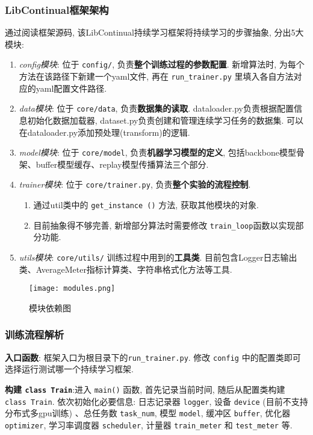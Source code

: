 \subsubsection{LibContinual框架架构} 
通过阅读框架源码, 该LibContinual持续学习框架将持续学习的步骤抽象, 分出5大模块: 
\begin{enumerate}
    \item \textit{config模块}: 位于 \lstinline{config/}, 负责\textbf{整个训练过程的参数配置}. 新增算法时, 为每个方法在该路径下新建一个yaml文件, 再在 \lstinline{run_trainer.py} 里填入各自方法对应的yaml配置文件路径.  
    \item \textit{data模块}: 位于 \lstinline{core/data}, 负责\textbf{数据集的读取}. dataloader.py负责根据配置信息初始化数据加载器,  dataset.py负责创建和管理连续学习任务的数据集. 可以在dataloader.py添加预处理(transform)的逻辑. 
    \item \textit{model模块}: 位于 \lstinline{core/model}, 负责\textbf{机器学习模型的定义}, 包括backbone模型骨架、buffer模型缓存、replay模型传播算法三个部分. 
    \item \textit{trainer模块}: 位于 \lstinline{core/trainer.py}, 负责\textbf{整个实验的流程控制}. 
        \begin{enumerate}
        \item 通过util类中的 \lstinline{get_instance ()} 方法, 获取其他模块的对象. 
        \item 目前抽象得不够完善, 新增部分算法时需要修改 \lstinline{train_loop}函数以实现部分功能. 
        \end{enumerate}
    \item \textit{utils模块}: \lstinline{core/utils/} 训练过程中用到的\textbf{工具类}. 目前包含Logger日志输出类、AverageMeter指标计算类、字符串格式化方法等工具. 
\end{enumerate}
\begin{figure}[H]
    \centering
    \texttt{[image: modules.png]}
    \caption{模块依赖图}
    \label{fig:框架图}
\end{figure}

\subsubsection{训练流程解析}

\textbf{入口函数}: 框架入口为根目录下的\lstinline{run_trainer.py}. 修改 \lstinline{config} 中的配置类即可选择运行测试哪一个持续学习框架. 

\textbf{构建 \lstinline{class Train}}:进入 \lstinline{main()} 函数, 首先记录当前时间, 随后从配置类构建 \lstinline{class Train}. 依次初始化必要信息: 日志记录器 \lstinline{logger}, 设备 \lstinline{device} (目前不支持分布式多gpu训练) 、总任务数 \lstinline{task_num}, 模型 \lstinline{model}, 缓冲区 \lstinline{buffer}, 优化器 \lstinline{optimizer}, 学习率调度器 \lstinline{scheduler}, 计量器 \lstinline{train_meter} 和 \lstinline{test_meter} 等. 

